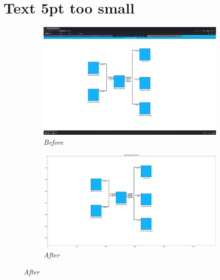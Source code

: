 \documentclass{article}
\begin{document}

\section{Text 5pt too small}
\begin{figure}[H]
    \centering
    \begin{subfigure}[t]{0.9\textwidth}
        \centering
        \includegraphics[width=\textwidth]{testcases/text_5pt_too_small/154310-836128_input_image.png}
        \caption*{\textit{Before}}
    \end{subfigure}
    \newline
    \begin{subfigure}[t]{0.9\textwidth}
        \centering
        \includegraphics[width=\textwidth]{testcases/text_5pt_too_small/154323-370828_element_bbox_errors_labeled_colored.png}
        \caption*{\textit{After}}
    \end{subfigure}
    \label{fig:text_too_small_5}
\end{figure}
\newpage
\end{document}
